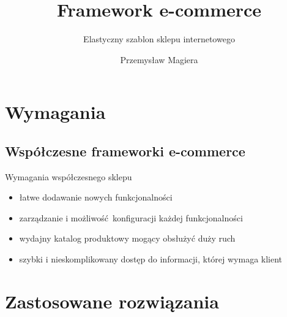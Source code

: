 \documentclass[polish,xcolor=table,9pt,aspectratio=1610,hyperref={pdfpagemode=FullScreen}]{beamer}
\title{Framework e-commerce}
\subtitle{Elastyczny szablon sklepu internetowego}
\author{Przemysław Magiera}
\begin{document}
\frame{\titlepage}

\section{Wymagania}
\subsection{Współczesne frameworki e-commerce}

\begin{frame}{Wymagania współczesnego sklepu}
\begin{itemize}
\item<1-> łatwe dodawanie nowych funkcjonalności 
\item<1-> zarządzanie i możliwość konfiguracji każdej funkcjonalności
\item<1-> wydajny katalog produktowy mogący obsłużyć duży ruch
\item<1-> szybki i nieskomplikowany dostęp do informacji, której wymaga klient

\end{itemize}
\end{frame}


\section{Zastosowane rozwiązania}
\end{document}
